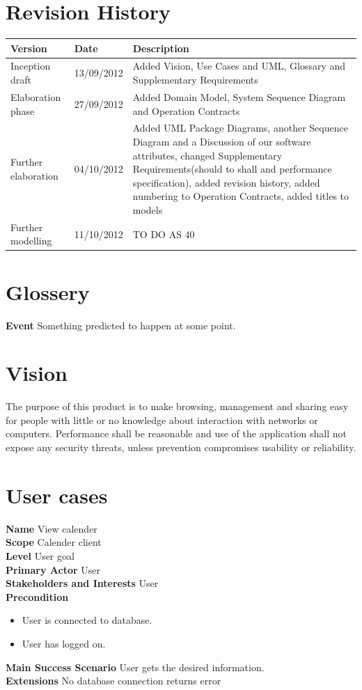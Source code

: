 \documentclass[a4paper,10pt,titlepage]{article}
\begin{document}
\section{Revision History}

\begin{center}
    \begin{tabular}{ | l | l | p{7cm}  | }
    \hline
    Version & Date & Description \\ \hline
    Inception draft & 13/09/2012 & Added Vision, Use Cases and UML, Glossary and Supplementary Requirements	\\ \hline
    Elaboration phase & 27/09/2012 & Added Domain Model, System Sequence Diagram and Operation Contracts\\ \hline
    Further elaboration & 04/10/2012 & Added UML Package Diagrams, another Sequence Diagram and a Discussion of our software attributes, changed Supplementary Requirements(should to shall and performance specification), added revision history, added numbering to Operation Contracts, added titles to models \\ \hline
    Further modelling & 11/10/2012 & TO DO AS 40	\\ \hline
    \end{tabular}
\end{center}

\section{Glossery}
	\textbf{Event}
	Something predicted to happen at some point.
	
\section{Vision}
	The purpose of this product is to make browsing, management and sharing easy for people with little or no knowledge about interaction with networks or computers. Performance shall be reasonable and use of the application shall not expose any security threats, unless prevention compromises usability or reliability.
	
\section{User cases}
	\textbf{Name}
	View calender
	\\
	\textbf{Scope}
	Calender client
	\\
	\textbf{Level}
	User goal
	\\
	\textbf{Primary Actor}
	User
	\\
	\textbf{Stakeholders and Interests}
	User
	\\
	\textbf{Precondition}
		\begin{itemize}
		\item User is connected to database.
		\item User has logged on.
		\\
		\end{itemize}
	\textbf{Main Success Scenario}
	User gets the desired information.
	\\
	\textbf{Extensions}
	No database connection returns error
	\\
	
\end{document}
